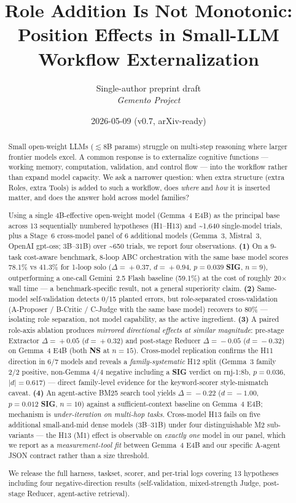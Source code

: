 \documentclass[11pt]{article}
\title{Role Addition Is Not Monotonic:\\
       Position Effects in Small-LLM Workflow Externalization}
\author{Single-author preprint draft \\ \emph{Gemento Project}}
\date{2026-05-09 (v0.7, arXiv-ready)}
\newcommand{\sig}{\textbf{SIG}}
\newcommand{\NS}{\textbf{NS}}
\begin{document}
\maketitle

\begin{abstract}
\noindent
Small open-weight LLMs ($\lesssim$8B params) struggle on multi-step reasoning where larger frontier models excel. A common response is to externalize cognitive functions --- working memory, computation, validation, and control flow --- into the workflow rather than expand model capacity. We ask a narrower question: when extra structure (extra Roles, extra Tools) is added to such a workflow, does \emph{where} and \emph{how} it is inserted matter, and does the answer hold across model families?

Using a single 4B-effective open-weight model (Gemma~4 E4B) as the principal base across 13 sequentially numbered hypotheses (H1--H13) and {\textasciitilde}1{,}640 single-model trials, plus a Stage~6 cross-model panel of 6 additional models (Gemma~3, Mistral~3, OpenAI gpt-oss; 3B--31B) over {\textasciitilde}650 trials, we report four observations.
\textbf{(1)} On a 9-task cost-aware benchmark, 8-loop ABC orchestration with the same base model scores 78.1\% vs 41.3\% for 1-loop solo ($\Delta\!=\!+0.37$, $d\!=\!+0.94$, $p\!=\!0.039$ \sig, $n\!=\!9$), outperforming a one-call Gemini~2.5 Flash baseline (59.1\%) at the cost of roughly 20$\times$ wall time --- a benchmark-specific result, not a general superiority claim.
\textbf{(2)} Same-model self-validation detects 0/15 planted errors, but role-separated cross-validation (A-Proposer / B-Critic / C-Judge with the same base model) recovers to 80\% --- isolating role separation, not model capability, as the active ingredient.
\textbf{(3)} A paired role-axis ablation produces \emph{mirrored directional effects at similar magnitude}: pre-stage Extractor $\Delta\!=\!+0.05$ ($d\!=\!+0.32$) and post-stage Reducer $\Delta\!=\!-0.05$ ($d\!=\!-0.32$) on Gemma~4 E4B (both \NS{} at $n\!=\!15$). Cross-model replication confirms the H11 direction in 6/7 models and reveals a \emph{family-systematic} H12 split (Gemma~3 family 2/2 positive, non-Gemma 4/4 negative including a \sig{} verdict on rnj-1:8b, $p\!=\!0.036$, $|d|\!=\!0.617$) --- direct family-level evidence for the keyword-scorer style-mismatch caveat.
\textbf{(4)} An agent-active BM25 search tool yields $\Delta\!=\!-0.22$ ($d\!=\!-1.00$, $p\!=\!0.012$ \sig, $n\!=\!10$) against a sufficient-context baseline on Gemma~4 E4B; mechanism is \emph{under-iteration on multi-hop tasks}. Cross-model H13 fails on five additional small-and-mid dense models (3B--31B) under four distinguishable M2 sub-variants --- the H13 (M1) effect is observable on \emph{exactly one} model in our panel, which we report as a \emph{measurement-tool fit} between Gemma~4 E4B and our specific A-agent JSON contract rather than a size threshold.

We release the full harness, taskset, scorer, and per-trial logs covering 13 hypotheses including four negative-direction results (self-validation, mixed-strength Judge, post-stage Reducer, agent-active retrieval).
\end{abstract}
\end{document}
